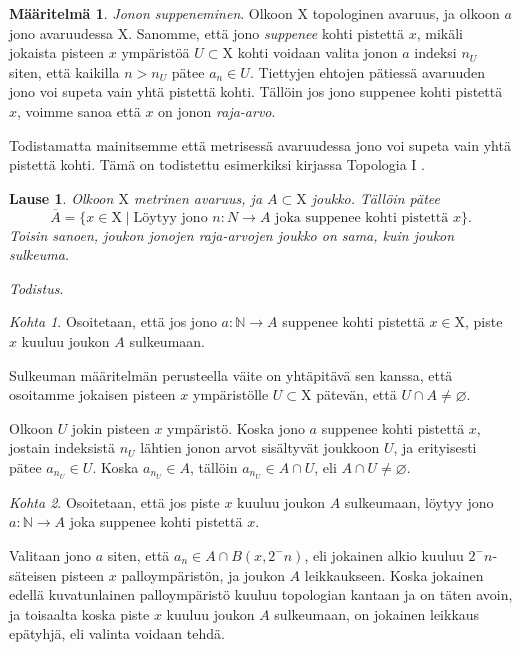 \documentclass[12pt,a4paper,leqno]{report}
\newcommand{\N}{\mathbb{N}}
\newcommand{\X}{\mathrm{X}}
\theoremstyle{plain}
\newtheorem{lause}[equation]{Lause}
\theoremstyle{definition}
\newtheorem{maar}[equation]{Määritelmä}
\theoremstyle{remark}
\begin{document}
\begin{maar}\label{jonosupmaar}
\emph{Jonon suppeneminen}. Olkoon $\X$ topologinen avaruus, ja olkoon $a$ jono avaruudessa $\X$. Sanomme, että jono \emph{suppenee} kohti pistettä $x$, mikäli jokaista pisteen $x$ ympäristöä $U \subset \X$ kohti voidaan valita jonon $a$ indeksi $n_U$ siten, että kaikilla $n > n_U$ pätee $a_n \in U$. Tiettyjen ehtojen pätiessä avaruuden jono voi supeta vain yhtä pistettä kohti. Tällöin jos jono suppenee kohti pistettä $x$, voimme sanoa että $x$ on jonon \emph{raja-arvo}.
\end{maar}

Todistamatta mainitsemme että metrisessä avaruudessa jono voi supeta vain yhtä pistettä kohti. Tämä on todistettu esimerkiksi kirjassa Topologia I \cite{Topo1}.

\begin{lause}
Olkoon $\X$ metrinen avaruus, ja $A \subset \X$ joukko. Tällöin pätee
\begin{equation}
\overline{A} = \{x \in \X \mid \text{Löytyy jono } n : N \to A \text{ joka suppenee kohti pistettä } x\}\text{.}
\end{equation}
Toisin sanoen, joukon jonojen raja-arvojen joukko on sama, kuin joukon sulkeuma.
\end{lause}

\noindent\emph{Todistus}.

\emph{Kohta 1}. Osoitetaan, että jos jono $a : \N \to A$ suppenee kohti pistettä $x \in \X$, piste $x$ kuuluu joukon $A$ sulkeumaan.

Sulkeuman määritelmän perusteella väite on yhtäpitävä sen kanssa, että osoitamme jokaisen pisteen $x$ ympäristölle $U \subset \X$ pätevän, että $U \cap A \not= \varnothing$.

Olkoon $U$ jokin pisteen $x$ ympäristö. Koska jono $a$ suppenee kohti pistettä $x$, jostain indeksistä $n_U$ lähtien jonon arvot sisältyvät joukkoon $U$, ja erityisesti pätee $a_{n_U} \in U$. Koska $a_{n_U} \in A$, tällöin $a_{n_U} \in A \cap U$, eli $A \cap U \not= \varnothing$.

\emph{Kohta 2}. Osoitetaan, että jos piste $x$ kuuluu joukon $A$ sulkeumaan, löytyy jono $a : \N \to A$ joka suppenee kohti pistettä $x$.

Valitaan jono $a$ siten, että $a_n \in A \cap B(x, 2^-n)$, eli jokainen alkio kuuluu $2^-n$-säteisen pisteen $x$ palloympäristön, ja joukon $A$ leikkaukseen. Koska jokainen edellä kuvatunlainen palloympäristö kuuluu topologian kantaan ja on täten avoin, ja toisaalta koska piste $x$ kuuluu joukon $A$ sulkeumaan, on jokainen leikkaus epätyhjä, eli valinta voidaan tehdä.
\end{document}
